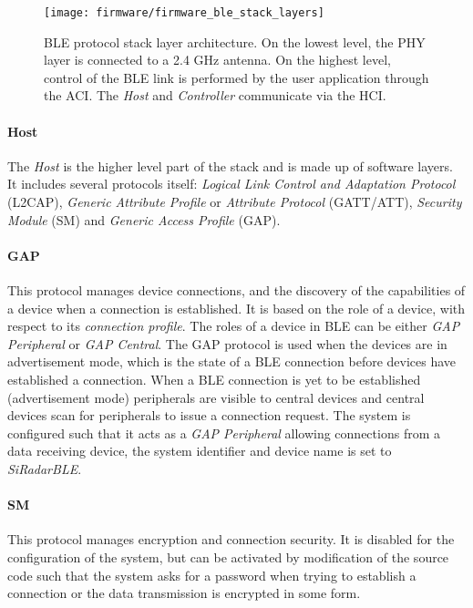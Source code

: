 \begin{figure}[ht]
	\centering
	\texttt{[image: firmware/firmware\_ble\_stack\_layers]}
	\caption{BLE protocol stack layer architecture. On the lowest level, the PHY layer is connected to a 2.4 GHz antenna. On the highest level, control of the BLE link is performed by the user application through the ACI. The \textit{Host} and \textit{Controller} communicate via the HCI.}
	\label{fig:firmware_ble_stack_layers}
\end{figure}

\paragraph{Host}

The \textit{Host} is the higher level part of the stack and is made up of software layers. It includes several protocols itself: \textit{Logical Link Control and Adaptation Protocol} (L2CAP), \textit{Generic Attribute Profile} or \textit{Attribute Protocol} (GATT/ATT), \textit{Security Module} (SM) and \textit{Generic Access Profile} (GAP).

\paragraph{GAP}
This protocol manages device connections, and the discovery of the capabilities of a device when a connection is established. It is based on the role of a device, with respect to its \textit{connection profile}. The roles of a device in BLE can be either \textit{GAP Peripheral} or \textit{GAP Central}. The GAP protocol is used when the devices are in advertisement mode, which is the state of a BLE connection before devices have established a connection. When a BLE connection is yet to be established (advertisement mode) peripherals are visible to central devices and central devices scan for peripherals to issue a connection request. The system is configured such that it acts as a \textit{GAP Peripheral} allowing connections from a data receiving device, the system identifier and device name is set to \textit{SiRadarBLE}.

\paragraph{SM}
This protocol manages encryption and connection security. It is disabled for the configuration of the system, but can be activated by modification of the source code such that the system asks for a password when trying to establish a connection or the data transmission is encrypted in some form.

